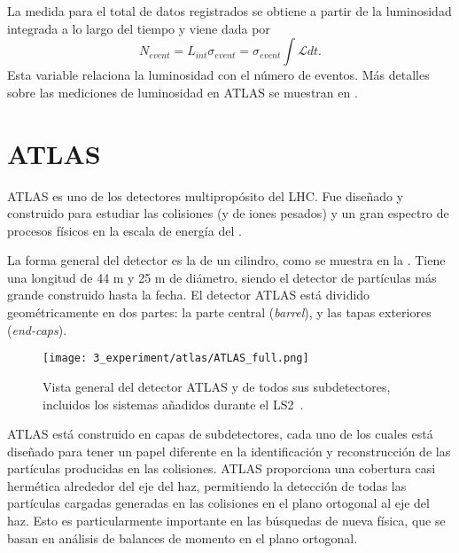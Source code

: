 La medida para el total de datos registrados se obtiene a partir de la luminosidad integrada a lo largo del tiempo y viene dada por
\begin{equation}
    N_{event} = L_{int} \sigma_{event} = \sigma_{event} \int \mathcal{L} dt.
    \label{eq:atlas:LHC:integrated_lumi}
\end{equation}
Esta variable relaciona la luminosidad con el número de eventos. Más detalles sobre las mediciones de luminosidad en \ac{ATLAS} se muestran en \Sect{\ref{sec:atlas:runs}}.








\FloatBarrier
\section{ATLAS}
\label{sec:atlas:atlas}

\ac{ATLAS} es uno de los detectores multipropósito del \ac{LHC}. Fue diseñado y construido para estudiar las colisiones \pp (y de iones pesados) y un gran espectro de procesos físicos en la escala de energía del \tev.

La forma general del detector es la de un cilindro, como se muestra en la \Fig{\ref{fig:atlas:atlas:atlas}}. Tiene una longitud de 44 m y 25 m de diámetro, siendo el detector de partículas más grande construido hasta la fecha. El detector \ac{ATLAS} está dividido geométricamente en dos partes: la parte central (\textit{barrel}), y las tapas exteriores (\textit{end-caps}).

\begin{figure}[ht!]
    \centering
    \texttt{[image: 3\_experiment/atlas/ATLAS\_full.png]}
    \caption{Vista general del detector \ac{ATLAS} y de todos sus subdetectores, incluidos los sistemas añadidos durante el \ac{LS2}~\cite{ATLAS-Diagram}.}
    \label{fig:atlas:atlas:atlas}
\end{figure}

\ac{ATLAS} está construido en capas de subdetectores, cada uno de los cuales está diseñado para tener un papel diferente en la identificación y reconstrucción de las partículas producidas en las colisiones. \ac{ATLAS} proporciona una cobertura casi hermética alrededor del eje del haz, permitiendo la detección de todas las partículas cargadas generadas en las colisiones en el plano ortogonal al eje del haz. Esto es particularmente importante en las búsquedas de nueva física, que se basan en análisis de balances de momento en el plano ortogonal.

